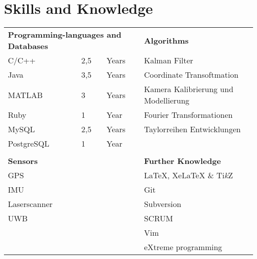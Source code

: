 \documentclass[a4paper,10pt]{article} %
\begin{document}
 
\section{Skills and Knowledge}
 
\begin{tabular}{ll@{  }ll}
\multicolumn{3}{l}{\textbf{Programming-languages and Databases}}   & \textbf{Algorithms }\\
C/C++        & 2,5 & Years                                         & Kalman Filter \\
Java         & 3,5 & Years                                         & Coordinate Transoftmation \\ 
MATLAB       & 3   & Years                                         & Kamera Kalibrierung und Modellierung \\ 
Ruby         & 1   & Year                                          & Fourier Transformationen  \\ 
MySQL        & 2,5 & Years                                         & Taylorreihen Entwicklungen \\ 
PostgreSQL   & 1   & Year                                          & \\ 
             &     &                                               & \\ 
\multicolumn{3}{l}{\textbf{Sensors}} & \textbf{Further Knowledge }\\
GPS          &     &                                               & LaTeX, XeLaTeX \& Ti\textit{k}Z\\ 
IMU          &     &                                               & Git \\ 
Laserscanner &     &                                               & Subversion \\ 
UWB          &     &                                               & SCRUM \\ 
             &     &                                               & Vim \\
             &     &                                               & eXtreme programming 
\end{tabular}
 
 
\end{document}

